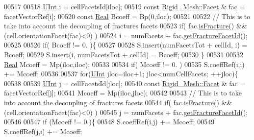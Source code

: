 \begin{DoxyCode}
00517                         
00518             \hyperlink{namespaceFVCode3D_a4bf7e328c75d0fd504050d040ebe9eda}{UInt} i = cellFacetsId[iloc];
00519             \textcolor{keyword}{const} \hyperlink{classFVCode3D_1_1Rigid__Mesh_1_1Facet}{Rigid\_Mesh::Facet} & fac = facetVectorRef[i];
00520             \textcolor{keyword}{const} \hyperlink{namespaceFVCode3D_a40c1f5588a248569d80aa5f867080e83}{Real} Bcoeff = Bp(0,iloc);
00521             
00522             \textcolor{comment}{// This is to take into account the decoupling of fractures facets}
00523                         \textcolor{keywordflow}{if}( fac.\hyperlink{classFVCode3D_1_1Rigid__Mesh_1_1Facet_aed3f579d52847e839501f647e90c35ab}{isFracture}() && (cell.orientationFacet(fac)<0) )
00524                                         i = numFacets + fac.\hyperlink{classFVCode3D_1_1Rigid__Mesh_1_1Facet_a08dc369eccd02b29133187cede7511eb}{getFractureFacetId}();
00525 
00526             \textcolor{keywordflow}{if}( Bcoeff != 0. )\{
00527 
00528                                 S.insert(numFacetsTot + cellId, i) = Bcoeff;
00529                                 S.insert(i, numFacetsTot + cellId) = Bcoeff;
00530                         \}
00531 
00532             \hyperlink{namespaceFVCode3D_a40c1f5588a248569d80aa5f867080e83}{Real} Mcoeff = Mp(iloc,iloc);
00533 
00534             \textcolor{keywordflow}{if}( Mcoeff != 0. )
00535                 S.coeffRef(i,i) += Mcoeff;
00536 
00537             \textcolor{keywordflow}{for}(\hyperlink{namespaceFVCode3D_a4bf7e328c75d0fd504050d040ebe9eda}{UInt} jloc=iloc+1; jloc<numCellFacets; ++jloc)\{
00538 
00539                 \hyperlink{namespaceFVCode3D_a4bf7e328c75d0fd504050d040ebe9eda}{UInt} j = cellFacetsId[jloc];
00540                 \textcolor{keyword}{const} \hyperlink{classFVCode3D_1_1Rigid__Mesh_1_1Facet}{Rigid\_Mesh::Facet} & fac = facetVectorRef[j];
00541                 Mcoeff = Mp(iloc,jloc);
00542                 
00543                 \textcolor{comment}{// This is to take into account the decoupling of fractures facets}
00544                                 \textcolor{keywordflow}{if}( fac.\hyperlink{classFVCode3D_1_1Rigid__Mesh_1_1Facet_aed3f579d52847e839501f647e90c35ab}{isFracture}() && (cell.orientationFacet(fac)<0) )
00545                                         j = numFacets + fac.\hyperlink{classFVCode3D_1_1Rigid__Mesh_1_1Facet_a08dc369eccd02b29133187cede7511eb}{getFractureFacetId}();
00546 
00547                 \textcolor{keywordflow}{if} (Mcoeff != 0.)\{
00548                     S.coeffRef(i,j) += Mcoeff;
00549                     S.coeffRef(j,i) += Mcoeff;

\end{DoxyCode}
